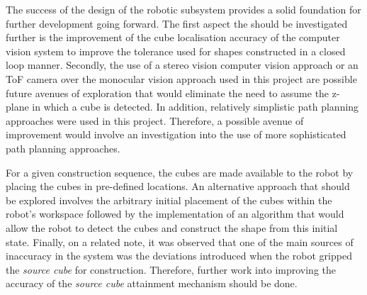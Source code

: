 The success of the design of the robotic subsystem provides a solid foundation for further development going forward. The first aspect the should be investigated further is the improvement of the cube localisation accuracy of the computer vision system to improve the tolerance used for shapes constructed in a closed loop manner. Secondly, the use of a stereo vision computer vision approach or an ToF camera over the monocular vision approach used in this project are possible future avenues of exploration that would eliminate the need to assume the z-plane in which a cube is detected. In addition, relatively simplistic path planning approaches were used in this project. Therefore, a possible avenue of improvement would involve an investigation into the use of more sophisticated path planning approaches. 

For a given construction sequence, the cubes are made available to the robot by placing the cubes in pre-defined locations. An alternative approach that should be explored involves the arbitrary initial placement of the cubes within the robot's workspace followed by the implementation of an algorithm that would allow the robot to detect the cubes and construct the shape from this initial state. Finally, on a related note, it was observed that one of the main sources of inaccuracy in the system was the deviations introduced when the robot gripped the \textit{source cube} for construction. Therefore, further work into improving the accuracy of the \textit{source cube} attainment mechanism should be done.

\newpage



